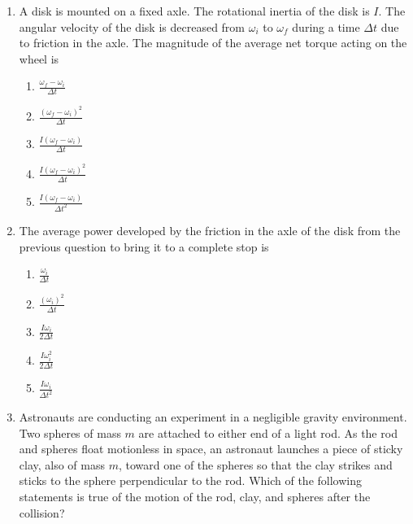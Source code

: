 \documentclass{../../../oss-classkick}
\begin{document}
\begin{multicols*}{2}
\begin{enumerate}[leftmargin=18pt]
  \item A disk is mounted on a fixed axle. The rotational inertia of the disk is
    $I$. The angular velocity of the disk is decreased from $\omega_i$ to
    $\omega_f$ during a time $\Delta t$ due to friction in the axle. The
    magnitude of the average net torque acting on the wheel is
    \begin{enumerate}[noitemsep,topsep=0pt,leftmargin=18pt,label=(\Alph*)]
    \item $\displaystyle\frac{\omega_f-\omega_i}{\Delta t}$
    \item $\displaystyle\frac{(\omega_f-\omega_i)^2}{\Delta t}$
    \item $\displaystyle\frac{I(\omega_f-\omega_i)}{\Delta t}$
    \item $\displaystyle\frac{I(\omega_f-\omega_i)^2}{\Delta t}$
    \item $\displaystyle\frac{I(\omega_f-\omega_i)}{\Delta t^2}$
    \end{enumerate}
    
  \item The average power developed by the friction in the axle of the disk
    from the previous question to bring it to a complete stop is
    \begin{enumerate}[itemsep=4pt,topsep=0pt,leftmargin=18pt,label=(\Alph*)]
    \item $\displaystyle\frac{\omega_i}{\Delta t}$
    \item $\displaystyle\frac{(\omega_i)^2}{\Delta t}$
    \item $\displaystyle\frac{I\omega_i}{2\Delta t}$
    \item $\displaystyle\frac{I\omega_i^2}{2\Delta t}$
    \item $\displaystyle\frac{I\omega_i}{\Delta t^2}$
    \end{enumerate}    

  \item Astronauts are conducting an experiment in a negligible gravity
    environment. Two spheres of mass $m$ are attached to either end of a light
    rod. As the rod and spheres float motionless in space, an astronaut
    launches a piece of sticky clay, also of mass $m$, toward one of the spheres
    so that the clay strikes and sticks to the sphere perpendicular to the rod.
    Which of the following statements is true of the motion of the rod, clay,
    and spheres after the collision?
    \begin{center}
\end{center}
\end{enumerate}
\end{multicols*}
\end{document}
